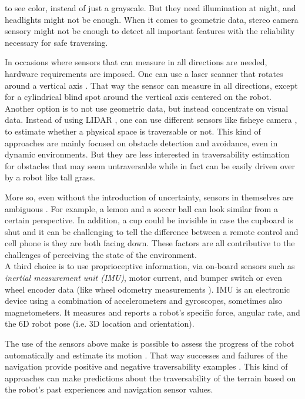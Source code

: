 \documentclass[12pt,a4paper,table,dvipsnames,tikz]{report}
\newcommand{\term}{\textit}
\newcommand{\acronym}{\MakeUppercase}
\begin{document}
	to see color, instead of just a grayscale. But they need illumination at night, 
	and headlights might not be enough. When it comes to geometric data, stereo 
	camera sensory might not be enough to detect all important features with the 
	reliability necessary for safe traversing.
	\par
	In occasions where sensors that can measure in all directions are needed, 
	hardware requirements are imposed. One can use a laser scanner that rotates 
	around a vertical axis \citep{Droeschel}. That way the sensor can measure in 
	all directions, except for a cylindrical blind spot around the vertical axis 
	centered on the robot.
	\\
	
	Another option is to not use geometric data, but instead concentrate on visual 
	data. Instead of using \acronym{lidar} \citep{Suger, Lalonde}, one can use 
	different sensors like fisheye camera \citep{Hirose, HiroseGonet}, 
	to estimate whether a physical space is traversable or not. This kind of 
	approaches are mainly focused on obstacle detection and avoidance, even in 
	dynamic environments. But they are less interested in traversability 
	estimation for obstacles that may seem untraversable while in fact can be 
	easily driven over by a robot like tall grass.
	\par
	More so, even without the introduction of uncertainty, sensors in themselves are 
	ambiguous \citep{Shabbir}. For example, a lemon and a soccer ball can look 
	similar from a certain perspective. In addition, a cup could be invisible in case 
	the cupboard is shut and it can be challenging to tell the difference between a 
	remote control and cell phone is they are both facing down. These factors are all
	contributive to the challenges of perceiving the state of the environment.
	\\
	
	A third choice is to use proprioceptive information, via on-board sensors such 
	as \term{inertial measurement unit (\acronym{imu})}, motor current, and bumper 
	switch \citep{Kim} or even wheel encoder data \citep{Lee} (like wheel odometry 
	measurements \citep{Droeschel}). \acronym{imu} is an electronic device using 
	a combination of accelerometers and gyroscopes, sometimes also magnetometers. 
	It measures and reports a robot's specific force, angular rate, and the 
	\acronym{6d} robot pose (i.e. \acronym{3d} location and orientation).
	\par
	The use of the sensors above make is possible to assess the progress of the 
	robot automatically and estimate its motion \citep{Droeschel}. That way successes 
	and failures of the navigation provide positive and negative traversability 
	examples \citep{Kim}. This kind of approaches can make predictions about the 
	traversability of the terrain based on the robot's past experiences and 
	navigation sensor values.
	\\
	
\end{document}
